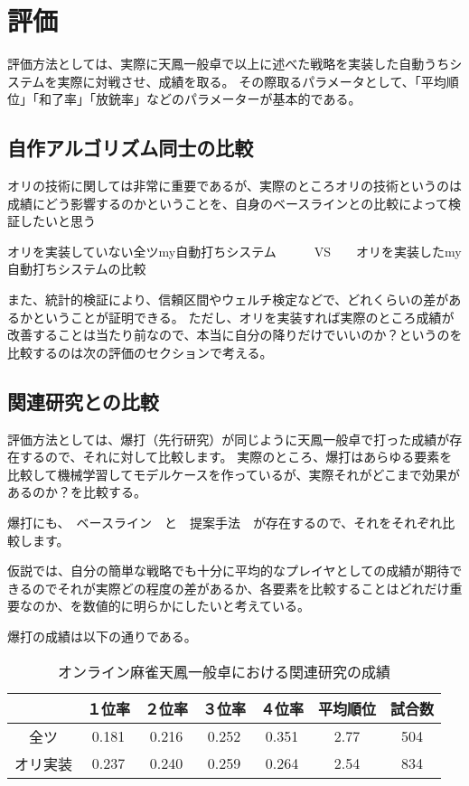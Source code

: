 \chapter{評価}
\label{chap:evaluation}

評価方法としては、実際に天鳳一般卓で以上に述べた戦略を実装した自動うちシステムを実際に対戦させ、成績を取る。
その際取るパラメータとして、「平均順位」「和了率」「放銃率」などのパラメーターが基本的である。


\section{自作アルゴリズム同士の比較}


オリの技術に関しては非常に重要であるが、実際のところオリの技術というのは成績にどう影響するのかということを、自身のベースラインとの比較によって検証したいと思う

オリを実装していない全ツmy自動打ちシステム　　　VS　　オリを実装したmy自動打ちシステムの比較　

また、統計的検証により、信頼区間やウェルチ検定などで、どれくらいの差があるかということが証明できる。
ただし、オリを実装すれば実際のところ成績が改善することは当たり前なので、本当に自分の降りだけでいいのか？というのを比較するのは次の評価のセクションで考える。

\section{関連研究との比較}

評価方法としては、爆打（先行研究）が同じように天鳳一般卓で打った成績が存在するので、それに対して比較します。
実際のところ、爆打はあらゆる要素を比較して機械学習してモデルケースを作っているが、実際それがどこまで効果があるのか？を比較する。

爆打にも、　ベースライン　と　提案手法　が存在するので、それをそれぞれ比較します。

仮説では、自分の簡単な戦略でも十分に平均的なプレイヤとしての成績が期待できるのでそれが実際どの程度の差があるか、各要素を比較することはどれだけ重要なのか、を数値的に明らかにしたいと考えている。

爆打の成績は以下の通りである。

\begin{table}[htbp]
  \caption{オンライン麻雀天鳳一般卓における関連研究の成績}
  \label{tb:bakuuti_score}
  \begin{center}
  \begin{tabular}{c|c|c|c|c|c|c}
    \hline
    	     & １位率 & ２位率 & ３位率 & ４位率 & 平均順位 & 試合数\\\hline\hline
    全ツ 	& 0.181 & 0.216 & 0.252 &0.351 & 2.77 & 504\\\hline
    オリ実装 & 0.237 &0.240 & 0.259 &0.264 & 2.54 & 834\\\hline
  \end{tabular}\end{center}
\end{table}



